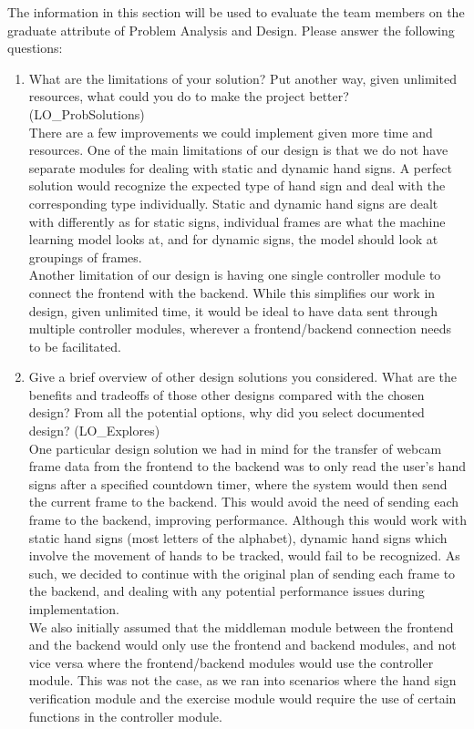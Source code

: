 \documentclass[12pt, titlepage]{article}
\begin{document}
The information in this section will be used to evaluate the team members on the
graduate attribute of Problem Analysis and Design.  Please answer the following questions:

\begin{enumerate}
  \item What are the limitations of your solution?  Put another way, given
  unlimited resources, what could you do to make the project better? (LO\_ProbSolutions)\\
  There are a few improvements we could implement given more time and resources. One of the main limitations of our design is that we
  do not have separate modules for dealing with static and dynamic hand signs. A perfect solution would recognize the expected type of
  hand sign and deal with the corresponding type individually. Static and dynamic hand signs are dealt with differently as for static signs,
  individual frames are what the machine learning model looks at, and for dynamic signs, the model should look at groupings of frames.\\
  Another limitation of our design is having one single controller module to connect the frontend with the backend. While this simplifies our
  work in design, given unlimited time, it would be ideal to have data sent through multiple controller modules, wherever a frontend/backend
  connection needs to be facilitated.
  \item Give a brief overview of other design solutions you considered.  What
  are the benefits and tradeoffs of those other designs compared with the chosen
  design?  From all the potential options, why did you select documented design?
  (LO\_Explores)\\
  One particular design solution we had in mind for the transfer of webcam frame data from the frontend to the backend was to
  only read the user's hand signs after a specified countdown timer, where the system would then send the current frame to the
  backend. This would avoid the need of sending each frame to the backend, improving performance. Although this would work with
  static hand signs (most letters of the alphabet), dynamic hand signs which involve the movement of hands to be tracked, would fail
  to be recognized. As such, we decided to continue with the original plan of sending each frame to the backend, and dealing with
  any potential performance issues during implementation.\\
  We also initially assumed that the middleman module between the frontend and the backend would only use the frontend and backend modules,
  and not vice versa where the frontend/backend modules would use the controller module. This was not the case, as we ran into
  scenarios where the hand sign verification module and the exercise module would require the use of certain functions in the controller
  module.
\end{enumerate}

% 

\newpage{}
\end{document}
